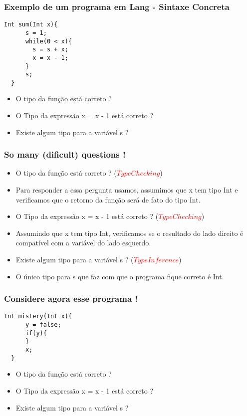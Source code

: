 \documentclass{beamer}
\begin{document}
\begin{frame}[fragile]
   \frametitle{Exemplo de um programa em Lang - Sintaxe Concreta}
\begin{lstlisting}[style=ast,escapechar=@]
  Int sum(Int x){
      s = 1;
      while(0 < x){
        s = s + x;
        x = x - 1;
      }
      s;
  }
\end{lstlisting}
   \begin{itemize}
      \pause
      \item O tipo da função está correto ?
      \pause
      \item O Tipo da expressão x = x - 1 está correto ? 
      \pause
      \item Existe algum tipo para a variável s ? 
   \end{itemize}

\end{frame}

\begin{frame}[fragile]
   \frametitle{So many (dificult) questions !}

   \begin{itemize}
      \item O tipo da função está correto ? (\textcolor{red}{$Type Checking$})
      \item Para responder a essa pergunta usamos, assumimos que x tem tipo Int e verificamos que o retorno da função será de fato do tipo Int.
      \pause
      \item O Tipo da expressão x = x - 1 está correto ? (\textcolor{red}{$Type Checking$}) 
      \item Assumindo que x tem tipo Int, verificamos se o resultado do lado direito é compatível com a variável do lado esquerdo.
      \pause
      \item Existe algum tipo para a variável s ? (\textcolor{red}{$Type Inference$})
      \item O único tipo para s que faz com que o programa fique correto é Int.
   \end{itemize}

\end{frame}

\begin{frame}[fragile]
   \frametitle{Considere agora esse programa !}
\begin{lstlisting}[style=ast,escapechar=@]
  Int mistery(Int x){
      y = false;
      if(y){
      }
      x;
  }
\end{lstlisting}
   \begin{itemize}
      \pause
      \item O tipo da função está correto ?
      \pause
      \item O Tipo da expressão x = x - 1 está correto ? 
      \pause
      \item Existe algum tipo para a variável s ? 
   \end{itemize}

\end{frame}
\end{document}
